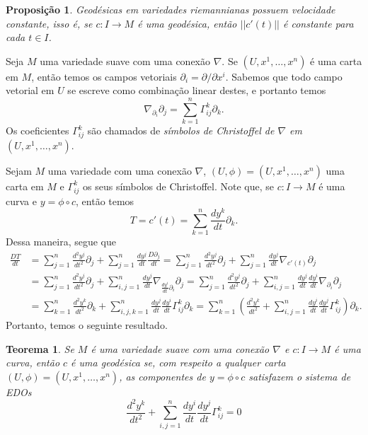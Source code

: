 \documentclass{article}
\newtheorem{proposition}[definition]{Proposição}
\newtheorem{theorem}[definition]{Teorema}
\begin{document}
\begin{proposition}
    Geodésicas em variedades riemannianas possuem velocidade constante, isso é, se $c \colon I \to M$ é uma geodésica, então $||c'(t)||$ é constante para cada $t \in I$.
\end{proposition}

Seja $M$ uma variedade suave com uma conexão $\nabla$. Se $(U, x^1, \dots, x^n)$ é uma carta em $M$, então temos os campos vetoriais $\partial_i = \partial/\partial x^i$. Sabemos que todo campo vetorial em $U$ se escreve como combinação linear destes, e portanto temos \begin{equation}
    \nabla_{\partial_i}\partial_j = \sum_{k = 1}^n \Gamma^k_{ij} \partial_k.
\end{equation}
Os coeficientes $\Gamma^k_{ij}$ são chamados de \textit{símbolos de Christoffel de $\nabla$ em $(U, x^1, \dots, x^n)$}.

Sejam $M$ uma variedade com uma conexão $\nabla$, $(U, \phi) = (U, x^1, \dots, x^n)$ uma carta em $M$ e $\Gamma^k_{ij}$ os seus símbolos de Christoffel. Note que, se $c \colon I \to M$ é uma curva e $y = \phi \circ c$, então temos \begin{equation}
    T = c'(t) = \sum_{k = 1}^n \frac{dy^k}{dt}\partial_k.
\end{equation} Dessa maneira, segue que \begin{align}
    \frac{DT}{dt} &= \sum_{j = 1}^n \frac{d^2y^j}{dt^2}\partial_j + \sum_{j = 1}^n \frac{dy^j}{dt}\frac{D\partial_j}{dt} = \sum_{j = 1}^n \frac{d^2y^j}{dt^2}\partial_j + \sum_{j = 1}^n \frac{dy^j}{dt} \nabla_{c'(t)}\partial_j \\ &= \sum_{j = 1}^n \frac{d^2y^j}{dt^2}\partial_j + \sum_{i,j = 1}^n \frac{dy^j}{dt} \nabla_{\frac{dy^i}{dt}\partial_i}\partial_j = \sum_{j = 1}^n \frac{d^2y^j}{dt^2}\partial_j + \sum_{i,j = 1}^n \frac{dy^j}{dt}\frac{dy^i}{dt}\nabla_{\partial_i}\partial_j \\ &= \sum_{k = 1}^n \frac{d^2y^k}{dt^2}\partial_k + \sum_{i,j,k = 1}^n \frac{dy^j}{dt}\frac{dy^i}{dt}\Gamma^k_{ij}\partial_k = \sum_{k = 1}^n \left(\frac{d^2y^k}{dt^2} + \sum_{i,j=1}^n \frac{dy^i}{dt}\frac{dy^j}{dt}\Gamma_{ij}^k\right)\partial_k.
\end{align} Portanto, temos o seguinte resultado.

\begin{theorem}
    Se $M$ é uma variedade suave com uma conexão $\nabla$ e $c \colon I \to M$ é uma curva, então $c$ é uma geodésica se, com respeito a qualquer carta $(U, \phi) = (U, x^1, \dots, x^n)$, as componentes de $y = \phi \circ c$ satisfazem o sistema de EDOs \begin{equation}
        \frac{d^2y^k}{dt^2} + \sum_{i,j=1}^n \frac{dy^i}{dt}\frac{dy^j}{dt}\Gamma_{ij}^k = 0
    \end{equation}
\end{theorem}
\end{document}
